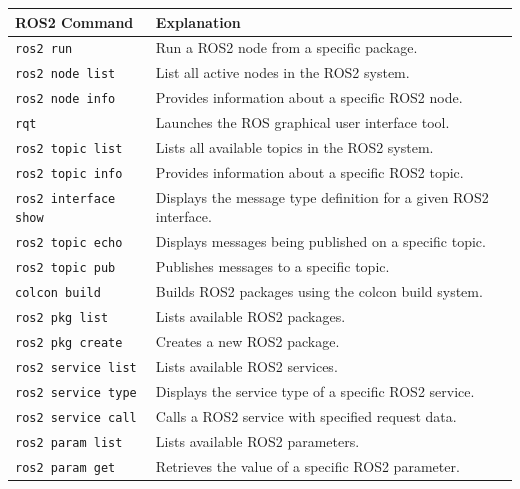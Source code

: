 \documentclass{article}
\begin{document}
\begin{table}[H]
    \centering
    \begin{tabular}{|p{6cm}|p{8cm}|}
        \hline
        \textbf{ROS2 Command} & \textbf{Explanation} \\
        \hline
        \texttt{ros2 run} & Run a ROS2 node from a specific package. \\
        \hline
        \texttt{ros2 node list} & List all active nodes in the ROS2 system. \\
        \hline
        \texttt{ros2 node info} & Provides information about a specific ROS2 node. \\
        \hline
        \texttt{rqt} & Launches the ROS graphical user interface tool. \\
        \hline
        \texttt{ros2 topic list} & Lists all available topics in the ROS2 system. \\
        \hline
        \texttt{ros2 topic info} & Provides information about a specific ROS2 topic. \\
        \hline
        \texttt{ros2 interface show} & Displays the message type definition for a given ROS2 interface. \\
        \hline
        \texttt{ros2 topic echo} & Displays messages being published on a specific topic. \\
        \hline
        \texttt{ros2 topic pub} & Publishes messages to a specific topic. \\
        \hline
        \texttt{colcon build} & Builds ROS2 packages using the colcon build system. \\
        \hline
        \texttt{ros2 pkg list} & Lists available ROS2 packages. \\
        \hline
        \texttt{ros2 pkg create} & Creates a new ROS2 package. \\
        \hline
        \texttt{ros2 service list} & Lists available ROS2 services. \\
        \hline
        \texttt{ros2 service type} & Displays the service type of a specific ROS2 service. \\
        \hline
        \texttt{ros2 service call} & Calls a ROS2 service with specified request data. \\
        \hline
        \texttt{ros2 param list} & Lists available ROS2 parameters. \\
        \hline
        \texttt{ros2 param get} & Retrieves the value of a specific ROS2 parameter. \\
        \hline

\end{tabular}
\end{table}
\end{document}
